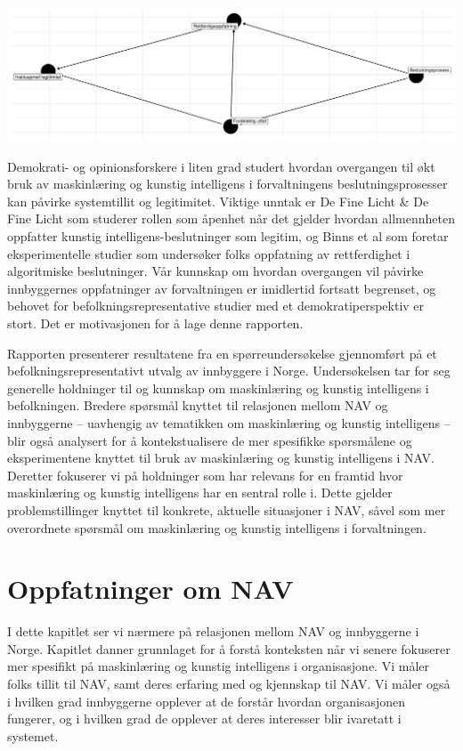 \documentclass[
]{book}
\begin{document}
\includegraphics{NAV_files/figure-latex/dag-1.pdf}

Demokrati- og opinionsforskere i liten grad studert hvordan overgangen til økt bruk av maskinlæring og kunstig intelligens i forvaltningens beslutningsprosesser kan påvirke systemtillit og legitimitet.
Viktige unntak er De Fine Licht \& De Fine Licht \citeyearpar{de2020artificial} som studerer rollen som åpenhet når det gjelder hvordan allmennheten oppfatter kunstig intelligens-beslutninger som legitim, og Binns et al \citeyearpar{binns2018s} som foretar eksperimentelle studier som undersøker folks oppfatning av rettferdighet i algoritmiske beslutninger.
Vår kunnskap om hvordan overgangen vil påvirke innbyggernes oppfatninger av forvaltningen er imidlertid fortsatt begrenset, og behovet for befolkningsrepresentative studier med et demokratiperspektiv er stort.
Det er motivasjonen for å lage denne rapporten.

Rapporten presenterer resultatene fra en spørreundersøkelse gjennomført på et befolkningsrepresentativt utvalg av innbyggere i Norge.
Undersøkelsen tar for seg generelle holdninger til og kunnskap om maskinlæring og kunstig intelligens i befolkningen.
Bredere spørsmål knyttet til relasjonen mellom NAV og innbyggerne -- uavhengig av tematikken om maskinlæring og kunstig intelligens -- blir også analysert for å kontekstualisere de mer spesifikke spørsmålene og eksperimentene knyttet til bruk av maskinlæring og kunstig intelligens i NAV.
Deretter fokuserer vi på holdninger som har relevans for en framtid hvor maskinlæring og kunstig intelligens har en sentral rolle i.
Dette gjelder problemstillinger knyttet til konkrete, aktuelle situasjoner i NAV, såvel som mer overordnete spørsmål om maskinlæring og kunstig intelligens i forvaltningen.

\hypertarget{oppfatninger-om-nav}{%
\chapter{Oppfatninger om NAV}\label{oppfatninger-om-nav}}

I dette kapitlet ser vi nærmere på relasjonen mellom NAV og innbyggerne i Norge.
Kapitlet danner grunnlaget for å forstå konteksten når vi senere fokuserer mer spesifikt på maskinlæring og kunstig intelligens i organisasjone.
Vi måler folks tillit til NAV, samt deres erfaring med og kjennskap til NAV.
Vi måler også i hvilken grad innbyggerne opplever at de forstår hvordan organisasjonen fungerer, og i hvilken grad de opplever at deres interesser blir ivaretatt i systemet.
\end{document}
